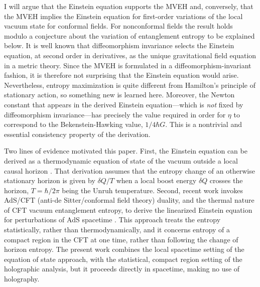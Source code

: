 \documentclass[aps,prd,twocolumn,showpacs,groupedaddress,nofootinbib,longbibliography]{revtex4-1}
\def\d{\delta}\def\D{\Delta}
\begin{document}
I will argue that the Einstein equation supports the MVEH and, conversely, that the MVEH implies the
Einstein equation for first-order  variations of the local vacuum state for conformal fields.
For nonconformal fields the result holds modulo a conjecture about the variation of entanglement 
entropy to be explained below. 
It is well known that diffeomorphism invariance selects the Einstein equation, at second order in derivatives,
as the unique gravitational field equation in a metric theory.  
Since the MVEH is formulated in  a diffeomorphism-invariant fashion, 
it is therefore not surprising that the Einstein equation would arise. Nevertheless, entropy maximization
is quite different from Hamilton's principle of stationary action, so something
new is learned here. Moreover, the Newton constant that appears in the derived 
Einstein equation---which is {\it not} fixed by diffeomorphism invariance---has precisely the value required 
in order for $\eta$ to correspond to the Bekenstein-Hawking value, $1/4\hbar G$. This is a nontrivial and 
essential consistency property of the derivation.


Two lines of evidence motivated this paper.
First, the Einstein equation can be derived as a thermodynamic equation of state of the vacuum
outside a local causal horizon \cite{Jacobson:1995ab}. That derivation assumes that the entropy 
change of an otherwise stationary horizon is given by $\d Q/T$ when a local boost energy $\d Q$ 
crosses the horizon, $T=\hbar/2\pi$ being the Unruh temperature.
%
Second, recent work invokes AdS/CFT (anti-de Sitter/conformal field theory) duality, and the thermal nature of CFT vacuum entanglement entropy, to derive the linearized Einstein equation for perturbations of AdS spacetime \cite{Lashkari:2013koa,Faulkner:2013ica,Swingle:2014uza}. This approach treats the entropy statistically, rather than  
thermodynamically, and it concerns entropy of a compact region in the CFT at one time, rather than following the change of horizon entropy. The present work combines the local spacetime setting of the equation of state approach, with the 
statistical, compact region setting of the holographic analysis, but it proceeds directly in spacetime, 
making no use of holography.   
\end{document}
